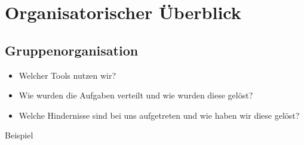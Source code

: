 \section{Organisatorischer Überblick}

\subsection{Gruppenorganisation}

\begin{itemize}
    \item Welcher Tools nutzen wir?
    \item Wie wurden die Aufgaben verteilt und wie wurden diese gelöst?
    \item Welche Hindernisse sind bei uns aufgetreten und wie haben wir diese gelöst?
\end{itemize}

\begin{listing}[ht]{}
    \caption{Beispiel}
    \label{listing:Beispiel}
\end{listing}
